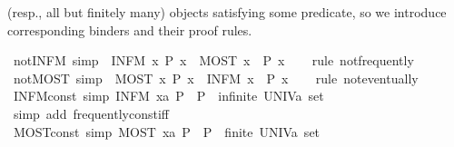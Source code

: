 \begin{isabellebody}
\begin{isamarkuptext}
  (resp., all but finitely many) objects satisfying some predicate, so
  we introduce corresponding binders and their proof rules.%
\end{isamarkuptext}\isamarkuptrue%
\isamarkupfalse%
\ not{\isacharunderscore}INFM\ {\isacharbrackleft}simp{\isacharbrackright}{\isacharcolon}\ {\isachardoublequoteopen}{\isasymnot}\ {\isacharparenleft}INFM\ x{\isachardot}\ P\ x{\isacharparenright}\ {\isasymlongleftrightarrow}\ {\isacharparenleft}MOST\ x{\isachardot}\ {\isasymnot}\ P\ x{\isacharparenright}{\isachardoublequoteclose}\isanewline
%
\isadelimproof
\ \ %
\endisadelimproof
%
\isatagproof
{}\isamarkupfalse%
\ {\isacharparenleft}rule\ not{\isacharunderscore}frequently{\isacharparenright}%
\endisatagproof
{\isafoldproof}%
%
\isadelimproof
\isanewline
%
\endisadelimproof
\isanewline
{}\isamarkupfalse%
\ not{\isacharunderscore}MOST\ {\isacharbrackleft}simp{\isacharbrackright}{\isacharcolon}\ {\isachardoublequoteopen}{\isasymnot}\ {\isacharparenleft}MOST\ x{\isachardot}\ P\ x{\isacharparenright}\ {\isasymlongleftrightarrow}\ {\isacharparenleft}INFM\ x{\isachardot}\ {\isasymnot}\ P\ x{\isacharparenright}{\isachardoublequoteclose}\isanewline
%
\isadelimproof
\ \ %
\endisadelimproof
%
\isatagproof
{}\isamarkupfalse%
\ {\isacharparenleft}rule\ not{\isacharunderscore}eventually{\isacharparenright}%
\endisatagproof
{\isafoldproof}%
%
\isadelimproof
\isanewline
%
\endisadelimproof
\isanewline
{}\isamarkupfalse%
\ INFM{\isacharunderscore}const\ {\isacharbrackleft}simp{\isacharbrackright}{\isacharcolon}\ {\isachardoublequoteopen}{\isacharparenleft}INFM\ x{\isacharcolon}{\isacharcolon}{\isacharprime}a{\isachardot}\ P{\isacharparenright}\ {\isasymlongleftrightarrow}\ P\ {\isasymand}\ infinite\ {\isacharparenleft}UNIV{\isacharcolon}{\isacharcolon}{\isacharprime}a\ set{\isacharparenright}{\isachardoublequoteclose}\isanewline
%
\isadelimproof
\ \ %
\endisadelimproof
%
\isatagproof
{}\isamarkupfalse%
\ {\isacharparenleft}simp\ add{\isacharcolon}\ frequently{\isacharunderscore}const{\isacharunderscore}iff{\isacharparenright}%
\endisatagproof
{\isafoldproof}%
%
\isadelimproof
\isanewline
%
\endisadelimproof
\isanewline
{}\isamarkupfalse%
\ MOST{\isacharunderscore}const\ {\isacharbrackleft}simp{\isacharbrackright}{\isacharcolon}\ {\isachardoublequoteopen}{\isacharparenleft}MOST\ x{\isacharcolon}{\isacharcolon}{\isacharprime}a{\isachardot}\ P{\isacharparenright}\ {\isasymlongleftrightarrow}\ P\ {\isasymor}\ finite\ {\isacharparenleft}UNIV{\isacharcolon}{\isacharcolon}{\isacharprime}a\ set{\isacharparenright}{\isachardoublequoteclose}\isanewline

\end{isabellebody}
